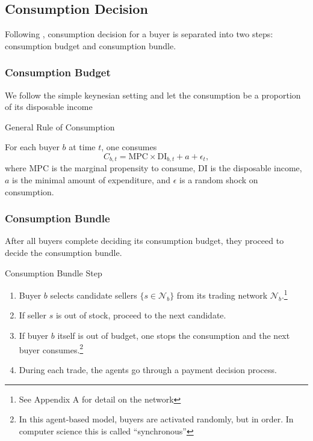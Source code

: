 
\subsection{Consumption Decision}

Following \citet*{HandbookABM}, consumption decision for a buyer is separated into two steps: consumption budget and consumption bundle.

\subsubsection*{Consumption Budget}

We follow the simple keynesian setting and let the consumption be a proportion of its disposable income

\begin{definition}{General Rule of Consumption}

   For each buyer $b$ at time $t$, one consumes
   \begin{equation}
      C_{b,t} = \mathrm{MPC}\times \mathrm{DI}_{b,t} + a + \epsilon_t ,
   \end{equation}
   where $\mathrm{MPC}$ is the marginal propensity to consume, $\mathrm{DI}$ is the disposable income, $a$ is the minimal amount of expenditure, and $\epsilon$ is a random shock on consumption.
\end{definition}

\subsubsection*{Consumption Bundle}
After all buyers complete deciding its consumption budget, they proceed to decide the consumption bundle.

\begin{definition}
{Consumption Bundle Step}
\begin{enumerate}
   \item Buyer $b$ selects candidate sellers $\{s \in \mathcal{N}_b\}$ from its trading network $\mathcal{N}_b$.\footnote{See Appendix A for detail on the network}
   \item If seller $s$ is out of stock, proceed to the next candidate.
   \item If buyer $b$ itself is out of budget, one stops the consumption and the next buyer consumes.\footnote{In this agent-based model, buyers are activated randomly, but in order. In computer science this is called ``synchronous''}
   \item During each trade, the agents go through a payment decision process.
\end{enumerate}
\end{definition}

